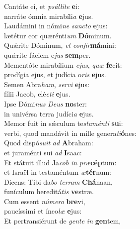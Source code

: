 \evenverse Cantáte ei, et \textit{psál}\textit{li}\textit{te} \textbf{e}i:~\*\\
\evenverse narráte ómnia mirabíli\textit{a} \textbf{e}jus.\\
\oddverse Laudámini in nómi\textit{ne} \textit{san}\textit{cto} \textbf{e}jus:~\*\\
\oddverse lætétur cor quærénti\textit{um} \textbf{Dó}minum.\\
\evenverse Quǽrite Dóminum, \textit{et} \textit{con}\textit{fir}\textbf{má}mini:~\*\\
\evenverse quǽrite fáciem e\textit{jus} \textbf{sem}per.\\
\oddverse Mementóte mirabílium \textit{e}\textit{jus}, \textit{quæ} \textbf{fe}cit:~\*\\
\oddverse prodígia ejus, et judícia o\textit{ris} \textbf{e}jus.\\
\evenverse Semen Abra\textit{ham}, \textit{ser}\textit{vi} \textbf{e}jus:~\*\\
\evenverse fílii Jacob, elé\textit{cti} \textbf{e}jus.\\
\oddverse Ipse Dómi\textit{nus} \textit{De}\textit{us} \textbf{no}ster:~\*\\
\oddverse in univérsa terra judíci\textit{a} \textbf{e}jus.\\
\evenverse Memor fuit in sǽculum te\textit{sta}\textit{mén}\textit{ti} \textbf{su}i:~\*\\
\evenverse verbi, quod mandávit in mille genera\textit{ti}\textbf{ó}nes:\\
\oddverse Quod dispó\textit{su}\textit{it} \textit{ad} \textbf{A}braham:~\*\\
\oddverse et juraménti sui \textit{ad} \textbf{I}saac:\\
\evenverse Et státuit illud Ja\textit{cob} \textit{in} \textit{præ}\textbf{cép}tum:~\*\\
\evenverse et Israël in testaméntum \textit{æ}\textbf{tér}num:\\
\oddverse Dicens: Tibi da\textit{bo} \textit{ter}\textit{ram} \textbf{Chá}naan,~\*\\
\oddverse funículum hereditá\textit{tis} \textbf{ve}stræ.\\
\evenverse Cum essent \textit{nú}\textit{me}\textit{ro} \textbf{bre}vi,~\*\\
\evenverse paucíssimi et ínco\textit{læ} \textbf{e}jus:\\
\oddverse Et pertransiérunt de \textit{gen}\textit{te} \textit{in} \textbf{gen}tem,~\*\\
